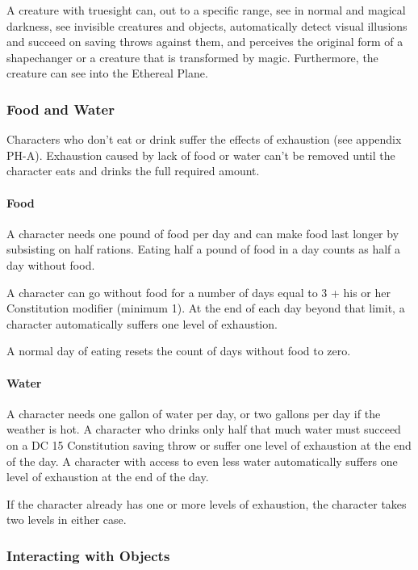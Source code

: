 \documentclass[
]{article}
\begin{document}
A creature with truesight can, out to a specific range, see in normal
and magical darkness, see invisible creatures and objects, automatically
detect visual illusions and succeed on saving throws against them, and
perceives the original form of a shapechanger or a creature that is
transformed by magic. Furthermore, the creature can see into the
Ethereal Plane.

\hypertarget{food-and-water}{%
\subsubsection{Food and Water}\label{food-and-water}}

Characters who don't eat or drink suffer the effects of exhaustion (see
appendix PH-A). Exhaustion caused by lack of food or water can't be
removed until the character eats and drinks the full required amount.

\hypertarget{food}{%
\paragraph{Food}\label{food}}

A character needs one pound of food per day and can make food last
longer by subsisting on half rations. Eating half a pound of food in a
day counts as half a day without food.

A character can go without food for a number of days equal to 3 + his or
her Constitution modifier (minimum 1). At the end of each day beyond
that limit, a character automatically suffers one level of exhaustion.

A normal day of eating resets the count of days without food to zero.

\hypertarget{water}{%
\paragraph{Water}\label{water}}

A character needs one gallon of water per day, or two gallons per day if
the weather is hot. A character who drinks only half that much water
must succeed on a DC 15 Constitution saving throw or suffer one level of
exhaustion at the end of the day. A character with access to even less
water automatically suffers one level of exhaustion at the end of the
day.

If the character already has one or more levels of exhaustion, the
character takes two levels in either case.

\hypertarget{interacting-with-objects}{%
\subsubsection{Interacting with
Objects}\label{interacting-with-objects}}
\end{document}
